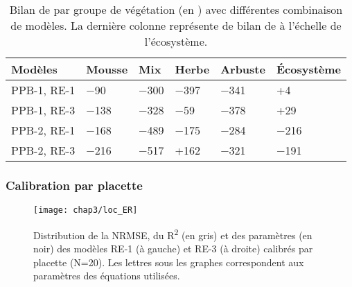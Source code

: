 \begin{table}
\centering
\caption{Bilan de \coo par groupe de végétation (en \si{\gcma}) avec différentes combinaison de modèles. La dernière colonne représente de bilan de \coo à l'échelle de l'écosystème.}
\label{table:bdc_grp}
\begin{tabular}{llllll}  \toprule
Modèles & Mousse & Mix & Herbe & Arbuste & Écosystème  \\ \midrule
PPB-1, RE-1 &  \num{-90} & \num{-300} & \num{-397} & \num{-341} & +\num{4}\\[+1ex]
PPB-1, RE-3 &  \num{-138} & \num{-328} & \num{-59} & \num{-378} & +\num{29} \\[+1ex]
PPB-2, RE-1 &  \num{-168} & \num{-489} & \num{-175} & \num{-284} & \num{-216} \\[+1ex]
PPB-2, RE-3 &  \num{-216} & \num{-517} & +\num{162} & \num{-321} & \num{-191}\\[+1ex]
\bottomrule
\end{tabular}
\end{table}

\subsubsection{Calibration par placette}


\begin{figure}
\centering
\texttt{[image: chap3/loc\_ER]}
\caption{Distribution de la NRMSE, du R\textsuperscript{2} (en gris) et des paramètres (en noir) des modèles RE-1 (à gauche) et RE-3 (à droite) calibrés par placette (N=20). Les lettres sous les graphes correspondent aux paramètres des équations utilisées.}
\label{fig:loc_ER}
\end{figure}

